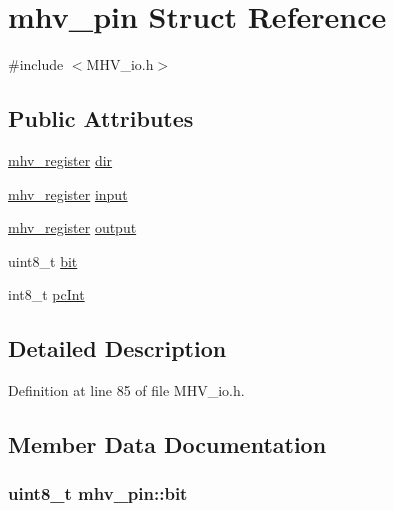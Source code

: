 \hypertarget{structmhv__pin}{\section{mhv\-\_\-pin Struct Reference}
\label{structmhv__pin}
}


{\ttfamily \#include $<$M\-H\-V\-\_\-io.\-h$>$}

\subsection*{Public Attributes}
\begin{DoxyCompactItemize}
\item 
\hyperlink{_m_h_v__io_8h_ae6ae31314a14d3c344aa74d6504f3401}{mhv\-\_\-register} \hyperlink{structmhv__pin_a117d8f9276e86e32a04f51d19a097ff1}{dir}
\item 
\hyperlink{_m_h_v__io_8h_ae6ae31314a14d3c344aa74d6504f3401}{mhv\-\_\-register} \hyperlink{structmhv__pin_aeeff3be931278e9976a842d922405f78}{input}
\item 
\hyperlink{_m_h_v__io_8h_ae6ae31314a14d3c344aa74d6504f3401}{mhv\-\_\-register} \hyperlink{structmhv__pin_ade591e6f7c3f52c5b1472b05ecc6248e}{output}
\item 
uint8\-\_\-t \hyperlink{structmhv__pin_a6e630b4b7c21827dd791ba0fd68f5c57}{bit}
\item 
int8\-\_\-t \hyperlink{structmhv__pin_a10252efa71e71a7e0e5ddb1d184c7101}{pc\-Int}
\end{DoxyCompactItemize}


\subsection{Detailed Description}


Definition at line 85 of file M\-H\-V\-\_\-io.\-h.



\subsection{Member Data Documentation}
\hypertarget{structmhv__pin_a6e630b4b7c21827dd791ba0fd68f5c57}{
\subsubsection[{bit}]{\setlength{\rightskip}{0pt plus 5cm}uint8\-\_\-t mhv\-\_\-pin\-::bit}}\label{structmhv__pin_a6e630b4b7c21827dd791ba0fd68f5c57}


